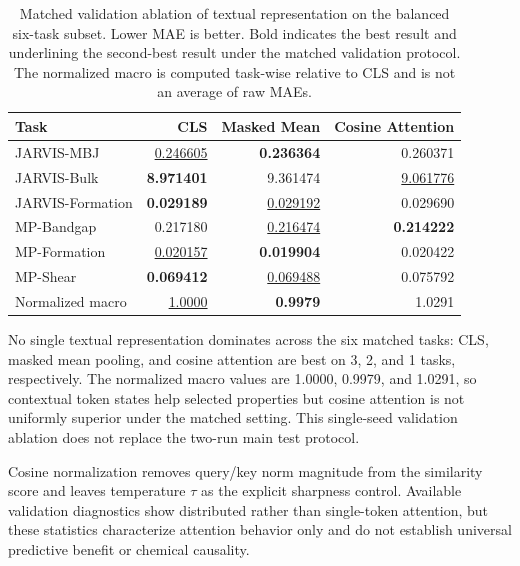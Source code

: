 \documentclass[a4paper,fleqn]{cas-sc}
\begin{document}
\begin{table}[H]
\caption{Matched validation ablation of textual representation on the balanced six-task subset. Lower MAE is better. Bold indicates the best result and underlining the second-best result under the matched validation protocol. The normalized macro is computed task-wise relative to CLS and is not an average of raw MAEs.}
\label{tab:matched_text}\centering\scriptsize
\begin{tabular}{lrrr}\toprule
Task&CLS&Masked Mean&Cosine Attention\\\midrule
JARVIS-MBJ&\underline{0.246605}&\textbf{0.236364}&0.260371\\
JARVIS-Bulk&\textbf{8.971401}&9.361474&\underline{9.061776}\\
JARVIS-Formation&\textbf{0.029189}&\underline{0.029192}&0.029690\\
MP-Bandgap&0.217180&\underline{0.216474}&\textbf{0.214222}\\
MP-Formation&\underline{0.020157}&\textbf{0.019904}&0.020422\\
MP-Shear&\textbf{0.069412}&\underline{0.069488}&0.075792\\\midrule
Normalized macro&\underline{1.0000}&\textbf{0.9979}&1.0291\\\bottomrule
\end{tabular}
\end{table}

No single textual representation dominates across the six matched tasks: CLS, masked mean pooling, and cosine attention are best on 3, 2, and 1 tasks, respectively. The normalized macro values are 1.0000, 0.9979, and 1.0291, so contextual token states help selected properties but cosine attention is not uniformly superior under the matched setting. This single-seed validation ablation does not replace the two-run main test protocol.

Cosine normalization removes query/key norm magnitude from the similarity score and leaves temperature $\tau$ as the explicit sharpness control. Available validation diagnostics show distributed rather than single-token attention, but these statistics characterize attention behavior only and do not establish universal predictive benefit or chemical causality.

\FloatBarrier
\end{document}
